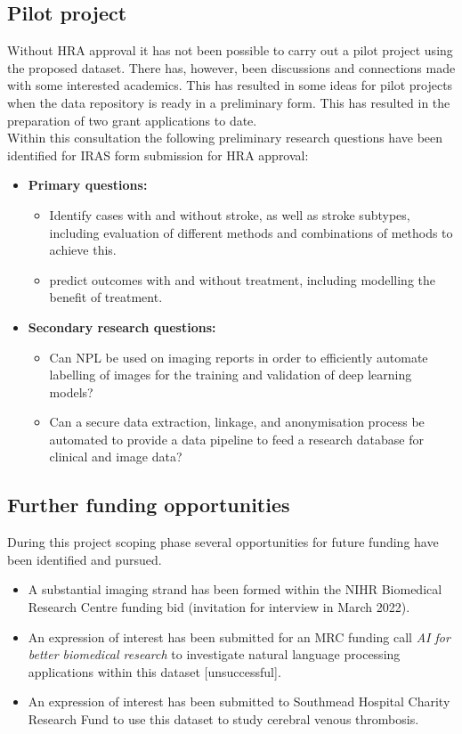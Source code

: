 \documentclass{article}
\begin{document}
\subsection{Pilot project}

Without HRA approval it has not been possible to carry out a pilot
project using the proposed dataset. There has, however, been
discussions and connections made with some interested academics. This
has resulted in some ideas for pilot projects when the data repository
is ready in a preliminary form. This has resulted in the preparation
of two grant applications to date. \\

Within this consultation the following preliminary research questions
have been identified for IRAS form submission for HRA approval:
\begin{itemize}
\item \textbf{Primary questions:}
  \begin{itemize}
  \item Identify cases with and without stroke, as well as stroke subtypes, including evaluation of different methods and combinations of methods to achieve this.
  \item predict outcomes with and without treatment, including
    modelling the benefit of treatment.
  \end{itemize}
\item \textbf{Secondary research questions:}
  \begin{itemize}
  \item Can NPL be used on imaging reports in order to efficiently automate labelling of images for the training and validation of deep learning models?
  \item Can a secure data extraction, linkage, and anonymisation
    process be automated to provide a data pipeline to feed a
    research database for clinical and image data?
  \end{itemize}
\end{itemize}



\subsection{Further funding opportunities}

During this project scoping phase several opportunities for future
funding have been identified and pursued.
\begin{itemize}
\item A substantial imaging strand has been formed within the NIHR
  Biomedical Research Centre funding bid (invitation for interview in
  March 2022).
\item An expression of interest has been submitted for an MRC funding
  call \textit{AI for better biomedical research} to investigate natural language processing
  applications within this dataset [unsuccessful].
\item An expression of interest has been submitted to Southmead Hospital Charity
  Research Fund to use this dataset to study cerebral venous thrombosis.
\end{itemize}
\end{document}

